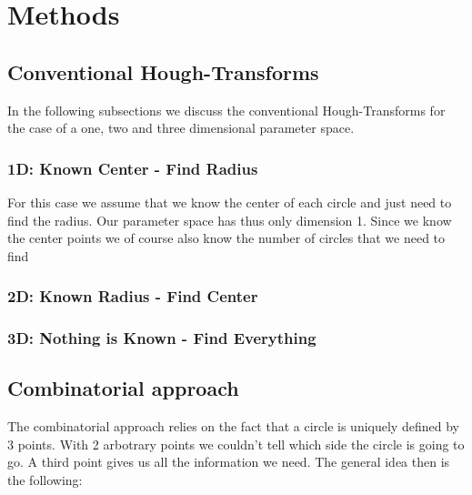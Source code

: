 \documentclass[10pt,twoside]{scrreprt}
\begin{document}


\chapter{Methods}

\section{Conventional Hough-Transforms} %
\label{sec:conventional_hough_transforms}

In the following subsections we discuss the conventional Hough-Transforms for the case of a one, two and three dimensional parameter space.

\subsection{1D: Known Center - Find Radius} %
\label{sub:1d_known_center_find_radius}

For this case we assume that we know the center of each circle and just need to find the radius. Our parameter space has thus only dimension 1. Since we know the center points we of course also know the number of circles that we need to find


\subsection{2D: Known Radius - Find Center} %
\label{sub:2d_known_radius_find_center}


\subsection{3D: Nothing is Known - Find Everything} %
\label{sub:3d_nothing_is_known_find_everything}


\section{Combinatorial approach}

The combinatorial approach relies on the fact that a circle is uniquely defined by 3 points. With 2 arbotrary points we couldn't tell which side the circle is
going to go. A third point gives us all the information we need. The general idea then is the following:
\end{document}
